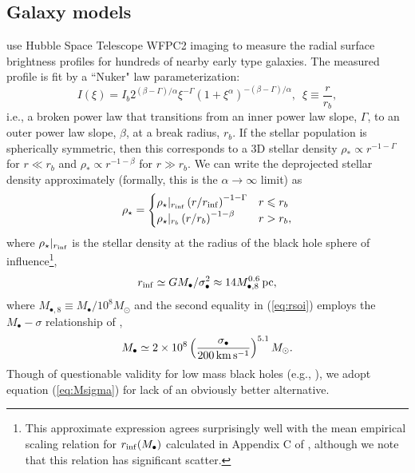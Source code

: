 \documentclass[usenatbib,fleqn]{mn2e}
\newcommand{\rb}{r_b}
\newcommand{\rhostar}{\rho_*}
\newcommand{\Mbh}[1][]{M_{\bullet#1}}
\newcommand{\rinf}{r_{\rm inf}}
\begin{document}
\subsection{Galaxy models}
\label{sec:gal_model}
\citet{LauerFaber+:2007a} use Hubble Space Telescope WFPC2 imaging to
measure the radial surface brightness profiles for hundreds of nearby
early type galaxies. The measured profile is fit by a ``Nuker" law parameterization:
\begin{equation}
  I(\xi)=I_b 2^{(\beta-\Gamma)/\alpha} \xi^{-\Gamma} (1+\xi^\alpha)^{-(\beta-\Gamma)/\alpha}, \,\,\,\xi\equiv\frac{r}{r_b},
\end{equation}
i.e., a broken power law that transitions from an inner power law
slope, $\Gamma$, to an outer power law slope, $\beta$, at a
break radius, $\rb$.  If the stellar population is spherically
symmetric, then this corresponds to a 3D stellar density $\rhostar \propto
r^{-1-\Gamma}$ for $r \ll \rb$ and $\rhostar\propto r^{-1-\beta}$ for
$r \gg \rb$.  We can write the deprojected stellar density approximately (formally, this is the $\alpha \rightarrow \infty$ limit) as
\begin{align}
\rho_\star = 
\begin{cases}
\rho_\star|_{\rinf} \left(r/\rinf\right)^{-1-\Gamma} & r \leq r_b\\
\rho_\star|_{r_b} \left(r/r_b\right)^{-1-\beta} & r > r_b,
\label{eq:rhostar}
\end{cases}
\end{align}
where $\rho_\star|_{\rinf}$ is the stellar density at the radius of the black hole sphere of influence\footnote{This approximate expression agrees surprisingly well with the mean empirical scaling relation for $r_{\rm inf}(M_\bullet)$ calculated in Appendix C of \citet{Stone&Metzger15}, although we note that this relation has significant scatter.}, 
\begin{equation}
  \rinf \simeq G \Mbh/\sigma_{\bullet}^2 \approx 14 M_{\bullet,8}^{0.6}\,{\rm pc},
\label{eq:rsoi}
\end{equation}
where $M_{\bullet,8} \equiv M_{\bullet}/10^{8}M_{\odot}$ and the
second equality in (\ref{eq:rsoi}) employs the $\Mbh-\sigma$
relationship of \citet{McConnellMa+:2011a},
 \begin{align}
M_{\bullet} \simeq 2\times 10^{8}\left(\frac{\sigma_{\bullet}}{200\,{\rm
      km\,s^{-1}}}\right)^{5.1}M_{\odot}.
\label{eq:Msigma}
\end{align}
Though of questionable validity for low mass black holes (e.g., \citealt{Greene&Ho07}), we adopt equation (\ref{eq:Msigma}) for lack of an obviously better alternative.
\end{document}
